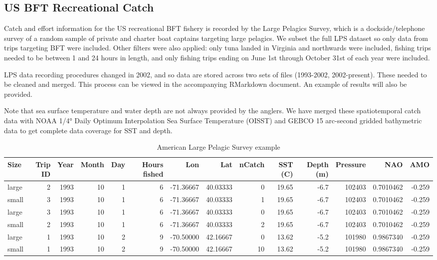 \documentclass[
]{article}
\begin{document}
\hypertarget{us-bft-recreational-catch}{%
\subsection{US BFT Recreational Catch}\label{us-bft-recreational-catch}}

Catch and effort information for the US recreational BFT fishery is recorded by the Large Pelagics Survey, which is a dockside/telephone survey of a random sample of private and charter boat captains targeting large pelagics. We subset the full LPS dataset so only data from trips targeting BFT were included. Other filters were also applied: only tuna landed in Virginia and northwards were included, fishing trips needed to be between 1 and 24 hours in length, and only fishing trips ending on June 1st through October 31st of each year were included.

LPS data recording procedures changed in 2002, and so data are stored across two sets of files (1993-2002, 2002-present). These needed to be cleaned and merged. This process can be viewed in the accompanying RMarkdown document. An example of results will also be provided.

Note that sea surface temperature and water depth are not always provided by the anglers. We have merged these spatiotemporal catch data with NOAA 1/4° Daily Optimum Interpolation Sea Surface Temperature (OISST) and GEBCO 15 arc-second gridded bathymetric data to get complete data coverage for SST and depth.

\begin{landscape}\begin{table}[H]

\caption{\label{tab:mergelps}American Large Pelagic Survey example}
\centering
\begin{tabular}[t]{lrrrrrrrrrrrrr}
\toprule
Size & Trip
ID & Year & Month & Day & Hours
fished & Lon & Lat & nCatch & SST
(C) & Depth
(m) & Pressure & NAO & AMO\\
\midrule
large & 2 & 1993 & 10 & 1 & 6 & -71.36667 & 40.03333 & 0 & 19.65 & -6.7 & 102403 & 0.7010462 & -0.259\\
small & 3 & 1993 & 10 & 1 & 6 & -71.36667 & 40.03333 & 1 & 19.65 & -6.7 & 102403 & 0.7010462 & -0.259\\
large & 3 & 1993 & 10 & 1 & 6 & -71.36667 & 40.03333 & 0 & 19.65 & -6.7 & 102403 & 0.7010462 & -0.259\\
small & 2 & 1993 & 10 & 1 & 6 & -71.36667 & 40.03333 & 2 & 19.65 & -6.7 & 102403 & 0.7010462 & -0.259\\
large & 1 & 1993 & 10 & 2 & 9 & -70.50000 & 42.16667 & 0 & 13.62 & -5.2 & 101980 & 0.9867340 & -0.259\\
\addlinespace
small & 1 & 1993 & 10 & 2 & 9 & -70.50000 & 42.16667 & 10 & 13.62 & -5.2 & 101980 & 0.9867340 & -0.259\\
\bottomrule
\end{tabular}
\end{table}
\end{landscape}
\end{document}
